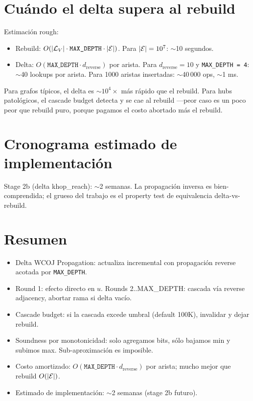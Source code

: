\section{Cuándo el delta supera al rebuild}

Estimación rough:

\begin{itemize}
    \item Rebuild: \(O(|\mathcal{L}_V| \cdot \texttt{MAX\_DEPTH} \cdot
    |\mathcal{E}|)\). Para \(|\mathcal{E}| = 10^7\): $\sim$10 segundos.
    \item Delta: \(O(\texttt{MAX\_DEPTH} \cdot d_{\mathrm{reverse}})\)
    por arista. Para \(d_{\mathrm{reverse}} = 10\) y
    \texttt{MAX\_DEPTH = 4}: $\sim$40 lookups por arista. Para 1000
    aristas insertadas: $\sim$40\,000 ops, $\sim$1 ms.
\end{itemize}

\noindent
Para grafos típicos, el delta es \(\sim 10^4\times\) más rápido que
el rebuild. Para hubs patológicos, el cascade budget detecta y se
cae al rebuild ---peor caso es un poco peor que rebuild puro,
porque pagamos el costo abortado más el rebuild.

\section{Cronograma estimado de implementación}

Stage 2b (delta khop\_reach): $\sim$2 semanas. La propagación
inversa es bien-comprendida; el grueso del trabajo es el property
test de equivalencia delta-vs-rebuild.

\section{Resumen}

\begin{itemize}
    \item Delta WCOJ Propagation: actualiza incremental con
    propagación reverse acotada por \texttt{MAX\_DEPTH}.
    \item Round 1: efecto directo en \(u\). Rounds 2..MAX\_DEPTH:
    cascada vía reverse adjacency, abortar rama si delta vacío.
    \item Cascade budget: si la cascada excede umbral
    (default 100K), invalidar y dejar rebuild.
    \item Soundness por monotonicidad: solo agregamos bits, sólo
    bajamos min y subimos max. Sub-aproximación es imposible.
    \item Costo amortizado: \(O(\texttt{MAX\_DEPTH} \cdot
    d_{\mathrm{reverse}})\) por arista; mucho mejor que rebuild
    \(O(|\mathcal{E}|)\).
    \item Estimado de implementación: $\sim$2 semanas (stage 2b
    futuro).
\end{itemize}

